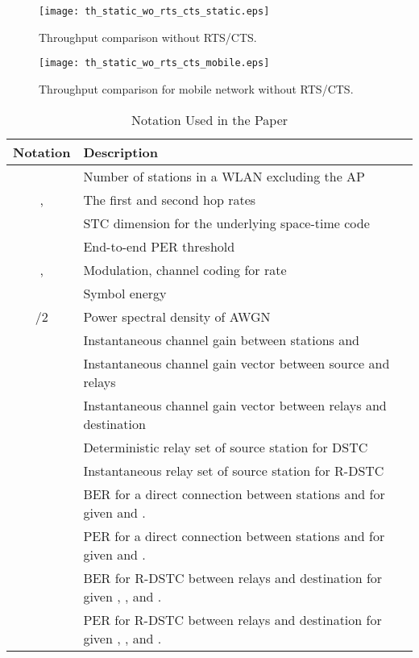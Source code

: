 \documentclass[peerreview,draftcls,onecolumn,12pt,a4paper]{IEEEtran}
\begin{document}
\begin{figure}[h!]
\centering
   \texttt{[image: th\_static\_wo\_rts\_cts\_static.eps]}
\caption{\label{fig:thnorts} Throughput comparison without RTS/CTS.}
\end{figure}

\begin{figure}[h!]
\centering
   \texttt{[image: th\_static\_wo\_rts\_cts\_mobile.eps]}
\caption{\label{fig:thnortsmobile} Throughput comparison for mobile network without RTS/CTS.}
\end{figure}


\pagebreak
\begin{table}[h!] \small
\begin{minipage}[b]{1\linewidth}
 \caption{Notation Used in the Paper}
\vspace{.01in} \centering
\begin{tabular}{c||l} \hline
\label{tab:parameters} \textbf{Notation} & \textbf{Description}
\\ \hline \hline  & Number of stations in a WLAN excluding the AP \\ \hline
,   & The first and second hop rates\\
\hline  & STC dimension for the underlying space-time code \\
\hline
  & End-to-end PER threshold\\
\hline
,  & Modulation, channel coding for rate \\
\hline  & Symbol energy\\ \hline /2 & Power spectral
density of AWGN \\ \hline  & Instantaneous channel gain
between stations  and 
\\  \hline
  & Instantaneous channel gain vector between  source and relays\\ \hline  &
 Instantaneous channel gain vector between relays and destination \\
\hline & Deterministic relay set of source station
 for DSTC \\ \hline  & Instantaneous relay set of
source station  for R-DSTC \\ \hline  &
BER for a direct connection between stations
 and  for given  and . \\
 & PER for a direct connection between stations  and  for given  and . \\
\hline  & BER for
R-DSTC between
relays and destination for given , ,  and . \\
  & PER for  R-DSTC  between relays and destination for given , ,  and . \\

\end{tabular}
\end{minipage}
\end{table}
\end{document}
